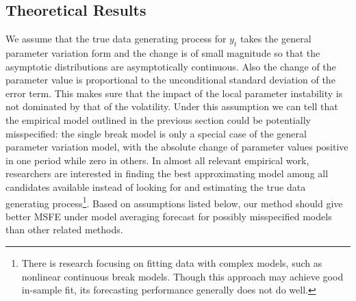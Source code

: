 \subsection{Theoretical Results}
We assume that the true data generating process for $y_t$ takes the general parameter variation form and the change is of small magnitude so that the asymptotic distributions are asymptotically continuous. Also the change of the parameter value is proportional to the unconditional standard deviation of the error term. This makes sure that the impact of the local parameter instability is not dominated by that of the volatility. Under this assumption we can tell that the empirical model outlined in the previous section could be potentially misspecified: the single break model is only a special case of the general parameter variation model, with the absolute change of parameter values positive in one period while zero in others. In almost all relevant empirical work, researchers are interested in finding the best approximating model among all candidates available instead of looking for and estimating the true data generating process\footnote{There is research focusing on fitting data with complex models, such as nonlinear continuous break models. Though this approach may achieve good in-sample fit, its forecasting performance generally does not do well.}. Based on assumptions listed below, our method should give better MSFE under model averaging forecast for possibly misspecified models than other related methods.
